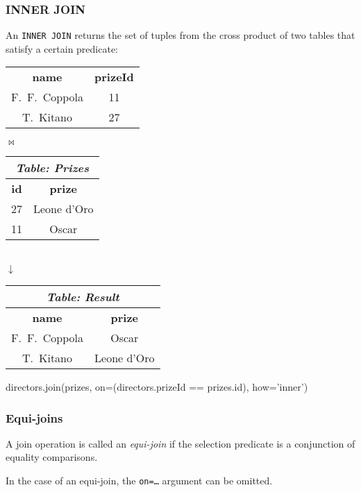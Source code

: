 \documentclass[english,serif,mathserif]{beamer}
\begin{document}
\begin{frame}[fragile]
  \frametitle{INNER JOIN}

  An \texttt{INNER JOIN} returns the set of tuples from the cross product of two
  tables that satisfy a certain predicate:

  \begin{center}
    \begin{tabular}{cc}
      \rowcolor{white}\multicolumn{2}{c}{\em Table: Directors}
      \\
      \hline
      \textbf{name} & \textbf{prizeId}
      \\
      \hline
      F.~F.~Coppola & 11
      \\
      T.~Kitano & 27
    \end{tabular}
    {\color{gray}$\pmb\Join$}
    \begin{tabular}{cc}
      \multicolumn{2}{c}{\em Table: Prizes}
      \\
      \hline
      \textbf{id} & \textbf{prize}
      \\
      \hline
      27 & Leone d'Oro
      \\
      11 & Oscar
    \end{tabular}
    \\
    {\color{gray}$\pmb\downarrow$}
    \\
    \begin{tabular}{cc}
      \multicolumn{2}{c}{\em Table: Result}
      \\
      \hline
      \textbf{name} & \textbf{prize}
      \\
      \hline
      F.~F.~Coppola & Oscar
      \\
      T.~Kitano & Leone d'Oro
      \\
    \end{tabular}

    \+
    \begin{minipage}{32ex}
      \begin{python}
directors.join(prizes,
  on=(directors.prizeId == prizes.id),
  how='inner')
    \end{python}
  \end{minipage}
  \end{center}
\end{frame}


\begin{frame}
  \frametitle{Equi-joins}

  A join operation is called an \emph{equi-join} if the selection predicate is a
  conjunction of equality comparisons.

  \+ In the case of an equi-join, the \texttt{on=\ldots} argument can be omitted.
\end{frame}
\end{document}
